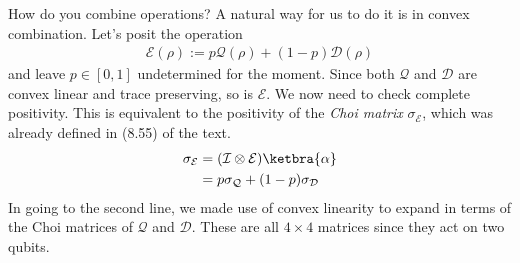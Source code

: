 \documentclass{book}
\begin{document}
    How do you combine operations? A natural way for us to do it is in convex combination. Let's posit the operation
    \begin{align}
        \mathcal{E}(\rho) := p \mathcal{Q}(\rho) + (1-p)\mathcal{D}(\rho)
    \end{align}
    and leave $p\in[0,1]$ undetermined for the moment. Since both $\mathcal{Q}$ and $\mathcal{D}$ are convex linear and trace preserving, so is $\mathcal{E}$. We now need to check complete positivity. This is equivalent to the positivity of the \emph{Choi matrix} $\sigma_\mathcal{E}$, which was already defined in (8.55) of the text.
    \begin{align}
    \begin{aligned}
        \sigma_\mathcal{E} &= (\mathcal{I} \otimes \mathcal{E}) \ketbra{\alpha} \\
        &= p \sigma_\mathcal{Q} + (1-p)\sigma_\mathcal{D}
    \end{aligned}
    \end{align}
    In going to the second line, we made use of convex linearity to expand in terms of the Choi matrices of $\mathcal{Q}$ and $\mathcal{D}$. These are all $4\times 4$ matrices since they act on two qubits.
\end{document}
